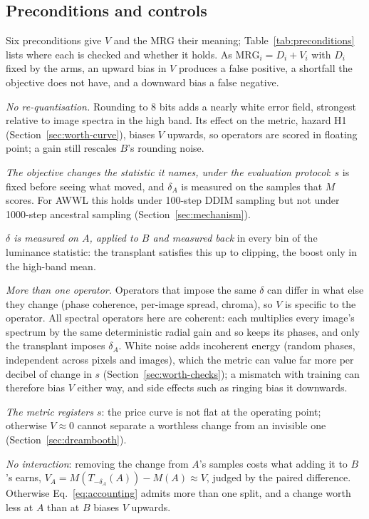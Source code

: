 \subsection{Preconditions and controls}
\label{sec:pricing-pre}

Six preconditions give $V$ and the MRG their meaning;
Table~\ref{tab:preconditions} lists where each is checked and whether it
holds. As $\mathrm{MRG}_i = D_i + V_i$ with $D_i$ fixed by the arms, an upward
bias in $V$ produces a false positive, a shortfall the objective does not
have, and a downward bias a false negative.
\begin{description}
  \setlength{\itemsep}{1pt}\setlength{\parskip}{0pt}
  \item[P0] \emph{No re-quantisation.} Rounding to 8 bits adds a nearly white
    error field, strongest relative to image spectra in the high band. Its
    effect on the metric, hazard H1 (Section~\ref{sec:worth-curve}), biases
    $V$ upwards, so operators are scored in floating point; a gain still
    rescales $B$'s rounding noise.
  \item[P1] \emph{The objective changes the statistic it names, under the
    evaluation protocol}: $s$ is fixed before seeing what moved, and
    $\delta_A$ is measured on the samples that $M$ scores. For AWWL this
    holds under 100-step DDIM sampling \citep{song2021denoising} but not
    under 1000-step ancestral sampling (Section~\ref{sec:mechanism}).
  \item[P2] \emph{$\delta$ is measured on $A$, applied to $B$ and measured
    back} in every bin of the luminance statistic: the transplant satisfies
    this up to clipping, the boost only in the high-band mean.
  \item[P3] \emph{More than one operator.} Operators that impose the same
    $\delta$ can differ in what else they change (phase coherence, per-image
    spread, chroma), so $V$ is specific to the operator. All spectral
    operators here are coherent: each multiplies every image's spectrum by
    the same deterministic radial gain and so keeps its phases, and only the
    transplant imposes $\delta_A$. White noise adds incoherent energy
    (random phases, independent across pixels and images), which the metric
    can value far more per decibel of change in $s$
    (Section~\ref{sec:worth-checks}); a mismatch with training can therefore
    bias $V$ either way, and side effects such as ringing bias it downwards.
  \item[P4] \emph{The metric registers $s$}: the price curve is not flat at
    the operating point; otherwise $V \approx 0$ cannot separate a worthless
    change from an invisible one (Section~\ref{sec:dreambooth}).
  \item[P5] \emph{No interaction}: removing the change from $A$'s samples
    costs what adding it to $B$'s earns,
    $V_A = M(T_{-\delta_A}(A)) - M(A) \approx V$, judged by the paired
    difference. Otherwise Eq.~\eqref{eq:accounting} admits more than one
    split, and a change worth less at $A$ than at $B$ biases $V$ upwards.
\end{description}

